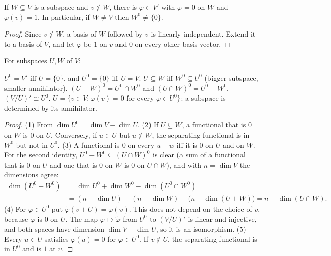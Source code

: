 \documentclass[10pt]{scrartcl}
\begin{document}
\begin{proposition*}
  If $W\subseteq V$ is a subspace and $v\notin W$, there is $\varphi\in V'$ with $\varphi=0$ on $W$ and $\varphi(v)=1$. In particular, if $W\ne V$ then $W^0\ne\{0\}$.
\end{proposition*}
\begin{proof}
  Since $v\notin W$, a basis of $W$ followed by $v$ is linearly independent. Extend it to a basis of $V$, and let $\varphi$ be $1$ on $v$ and $0$ on every other basis vector.
\end{proof}

\begin{proposition*}
  For subspaces $U,W$ of $V$:
  \begin{enumerate}
    \ii $U^0=V'$ iff $U=\{0\}$, and $U^0=\{0\}$ iff $U=V$.
    \ii $U\subseteq W$ iff $W^0\subseteq U^0$ (bigger subspace, smaller annihilator).
    \ii $(U+W)^0=U^0\cap W^0$ and $(U\cap W)^0=U^0+W^0$.
    \ii $(V/U)'\cong U^0$.
    \ii $U=\{v\in V:\varphi(v)=0\text{ for every }\varphi\in U^0\}$: a subspace is determined by its annihilator.
  \end{enumerate}
\end{proposition*}
\begin{proof}
  (1) From $\dim U^0=\dim V-\dim U$.
  (2) If $U\subseteq W$, a functional that is $0$ on $W$ is $0$ on $U$. Conversely, if $u\in U$ but $u\notin W$, the separating functional is in $W^0$ but not in $U^0$.
  (3) A functional is $0$ on every $u+w$ iff it is $0$ on $U$ and on $W$. For the second identity, $U^0+W^0\subseteq(U\cap W)^0$ is clear (a sum of a functional that is $0$ on $U$ and one that is $0$ on $W$ is $0$ on $U\cap W$), and with $n=\dim V$ the dimensions agree:
  \begin{align*}
    \dim(U^0+W^0)&=\dim U^0+\dim W^0-\dim(U^0\cap W^0)\\
    &=(n-\dim U)+(n-\dim W)-\big(n-\dim(U+W)\big)=n-\dim(U\cap W).
  \end{align*}
  (4) For $\varphi\in U^0$ put $\tilde\varphi(v+U)=\varphi(v)$. This does not depend on the choice of $v$, because $\varphi$ is $0$ on $U$. The map $\varphi\mapsto\tilde\varphi$ from $U^0$ to $(V/U)'$ is linear and injective, and both spaces have dimension $\dim V-\dim U$, so it is an isomorphism.
  (5) Every $u\in U$ satisfies $\varphi(u)=0$ for $\varphi\in U^0$. If $v\notin U$, the separating functional is in $U^0$ and is $1$ at $v$.
\end{proof}
\end{document}
